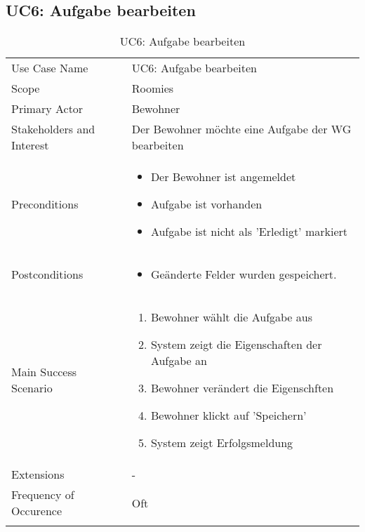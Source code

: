\subsection{UC6: Aufgabe bearbeiten}
\begin{table}[H]
	\tablestyle
	\tablealtcolored
	\begin{tabularx}{\textwidth}{lX}
		\tablebody
			Use Case Name &
			UC6: Aufgabe bearbeiten
			\tabularnewline
			Scope &
			Roomies
			\tabularnewline
			Primary Actor &
			Bewohner
			\tabularnewline
			Stakeholders and Interest &
			Der Bewohner möchte eine Aufgabe der WG bearbeiten
			\tabularnewline
			Preconditions &
			\begin{itemize}
				\item Der Bewohner ist angemeldet
				\item Aufgabe ist vorhanden
				\item Aufgabe ist nicht als 'Erledigt' markiert
			\end{itemize}
			\tabularnewline
			Postconditions &
			\begin{itemize}
				\item Geänderte Felder wurden gespeichert.
			\end{itemize}
			\tabularnewline
			Main Success Scenario &
			\begin{enumerate}
				\item Bewohner wählt die Aufgabe aus
				\item System zeigt die Eigenschaften der Aufgabe an
				\item Bewohner verändert die Eigenschften
				\item Bewohner klickt auf 'Speichern'
				\item System zeigt Erfolgsmeldung
			\end{enumerate}
			\tabularnewline
			Extensions &
			-
			\tabularnewline
			Frequency of Occurence &
			Oft
			\tabularnewline
		\tableend
	\end{tabularx}
	\caption{UC6: Aufgabe bearbeiten}
\end{table}


